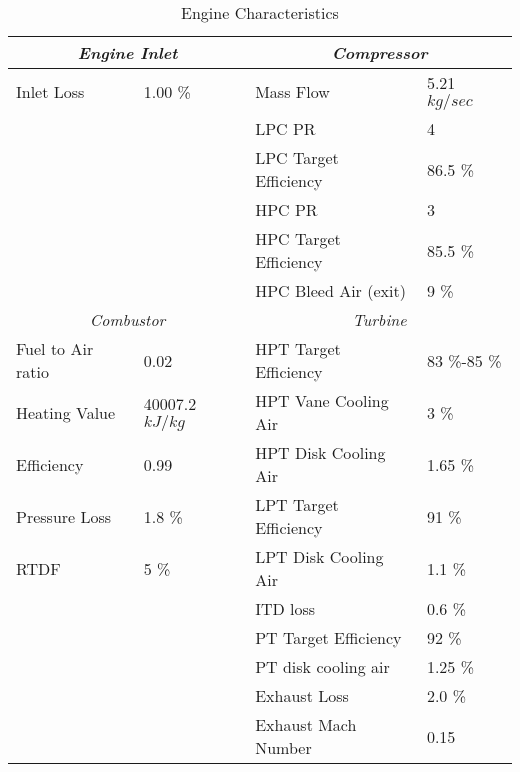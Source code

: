 \begin{table}[H]
    \caption{Engine Characteristics}
    \label{tab:enginecharacteristics}
    \centering
    \begin{tabular}[H]{l l l l}
    \toprule[1pt]
    \multicolumn{2}{c}{\textit{Engine Inlet}}    & \multicolumn{2}{c}{\textit{Compressor}}                    \\
    \midrule
    Inlet Loss     & 1.00 \%              &   Mass Flow                          &  5.21 $kg/sec$  \\
    && LPC PR & 4 \\
    && LPC Target Efficiency & 86.5 \% \\
    && HPC PR & 3 \\
    && HPC Target Efficiency & 85.5 \% \\
    && HPC Bleed Air (exit) & 9 \% \\
    \midrule
    \multicolumn{2}{c}{\textit{Combustor}}    & \multicolumn{2}{c}{\textit{Turbine}}                    \\
    \midrule
    Fuel to Air ratio & 0.02 & HPT Target Efficiency& 83 \%-85 \%\\
    Heating Value & 40007.2 $kJ/kg$ & HPT Vane Cooling Air& 3 \%\\
    Efficiency & 0.99 & HPT Disk Cooling Air& 1.65 \%\\
    Pressure Loss & 1.8 \% &LPT Target Efficiency& 91 \% \\
    RTDF & 5 \% &LPT Disk Cooling Air& 1.1 \%\\
    && ITD loss & 0.6 \% \\
    && PT Target Efficiency & 92 \%\\
    && PT disk cooling air & 1.25 \% \\
    && Exhaust Loss & 2.0 \% \\
    && Exhaust Mach Number & 0.15 \\
    \midrule[1pt]
    \end{tabular}
\end{table}